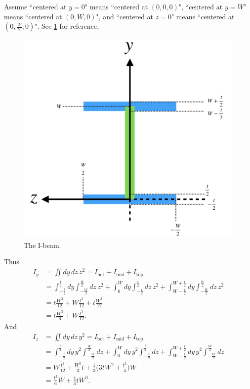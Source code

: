 \documentclass[12pt]{article}
\begin{document}
Assume ``centered at $y=0$" means ``centered at $(0, 0, 0)$", ``centered at $y=W$" means
``centered at $(0, W, 0)$", and ``centered at $z=0$" means ``centered at $(0, \frac{W}{2}, 0)$".
See \ref{fig:i-beam} for reference.
\begin{figure}[h]
	\centering
	\includegraphics[width=0.7\linewidth]{images/I-beam}
	\caption{The I-beam.}
	\label{fig:i-beam}
\end{figure}
Thus
\begin{equation}
	\begin{split}
		I_y &= \iint dy \, dz \, z^2 = I_\text{bot} + I_\text{mid} + I_\text{top} \\
		&= \int_{-\frac{ t }{ 2 }}^{\frac{ t }{ 2 }} dy \int_{-\frac{ W }{ 2 }}^{\frac{ W }{ 2 }} dz \, z^2
		+ \int_{0}^{W} dy \int_{-\frac{ t }{ 2 }}^{\frac{ t }{ 2 }} dz \, z^2
		+ \int_{W - \frac{ t }{ 2 }}^{W + \frac{ t }{ 2 }} dy \int_{-\frac{ W }{ 2 }}^{\frac{ W }{ 2 }} dz \, z^2 \\
		&= t \frac{ W^3 }{ 12 } + W \frac{ t^3 }{ 12 } + t \frac{ W^3 }{ 12 } \\
		&= t \frac{ W^3 }{ 6 } + W \frac{ t^3 }{ 12 }.
	\end{split}
\end{equation}
And
\begin{equation}
	\begin{split}
		I_z &= \iint dy \, dz \, y^2 = I_\text{bot} + I_\text{mid} + I_\text{top} \\
		&= \int_{-\frac{ t }{ 2 }}^{\frac{ t }{ 2 }} dy \, y^2 \int_{-\frac{ W }{ 2 }}^{\frac{ W }{ 2 }} dz
		+ \int_{0}^{W} dy \, y^2 \int_{-\frac{ t }{ 2 }}^{\frac{ t }{ 2 }} dz
		+ \int_{W - \frac{ t }{ 2 }}^{W + \frac{ t }{ 2 }} dy \, y^2 \int_{-\frac{ W }{ 2 }}^{\frac{ W }{ 2 }} dz \\
		&= W \frac{ t^3 }{ 12 } + \frac{ W^3 }{ 3 } t + \frac{ 1 }{ 3 } \Big( 3 t W^2 + \frac{ t^3 }{ 4 } \Big) W \\
		&= \frac{ t^3 }{ 6 } W + \frac{ 4 }{ 3 } t W^3.
	\end{split}
\end{equation}
\end{document}

